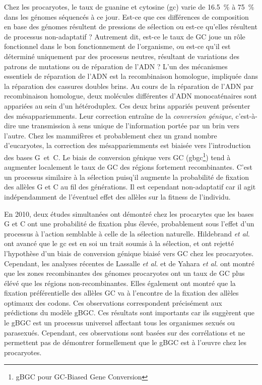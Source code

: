 Chez les procaryotes, le taux de guanine et cytosine (\ac{gc}) varie de
\SI{16.5}{\percent} à \SI{75}{\percent} dans les génomes séquencés à ce jour.
Est-ce que ces différences de composition en base des génomes résultent de
pressions de sélection ou est-ce qu'elles résultent de processus non-adaptatif ?
Autrement dit, est-ce le taux de GC joue un rôle fonctionnel dans le bon
fonctionnement de l'organisme, ou est-ce qu'il est déterminé uniquement par des
processus neutres, résultant de variations des patrons de mutations ou de
réparation de l'ADN ? L'un des mécanismes essentiels de réparation de l'ADN est
la recombinaison homologue, impliquée dans la réparation des cassures doubles
brins. Au cours de la réparation de l'ADN par recombinaison homologue, deux
molécules différentes d'ADN monocaténaires sont appariées au sein d'un
hétéroduplex. Ces deux brins appariés peuvent présenter des mésappariemments.
Leur correction entraîne de la \emph{conversion génique}\cite{chen_gene_2007},
c'est-à-dire une transmission à sens unique de l'information portée par un brin
vers l'autre. Chez les mammifères et probablement chez un grand nombre
d'eucaryotes, la correction des mésappariemments est biaisée vers l'introduction
des bases G~et~C\cite{pessia_evidence_2012}. Le biais de conversion génique vers
GC (\ac{gbgc}\footnote{gBGC pour GC-Biased Gene Conversion}) tend à augmenter
localement le taux de GC des régions fortement
recombinantes\cite{duret_biased_2009,lesecque_gc-biased_2013,williams_non-crossover_2015}.
C'est un processus similaire à la sélection puisq'il augmente la probabilité de
fixation des allèles G et C au fil des générations. Il est cependant
non-adaptatif car il agit indépendamment de l'éventuel effet des allèles sur la
fitness de l'individu.

En 2010, deux études simultanées\cite{hildebrand_evidence_2010,
  hershberg_evidence_2010} ont démontré chez les procarytes que les bases G et C
ont une probabilité de fixation plus élevée, probablement sous l'effet d'un
processus à l'action semblable à celle de la sélection naturelle. Hildebrand
\emph{et al.} ont avancé que le \ac{gc} est en soi un trait soumis à la
sélection, et ont rejetté l'hypothèse d'un biais de conversion génique biaisé
vers GC chez les procaryotes. Cependant, les analyses récentes de Lassalle
\emph{et al.} \cite{lassalle_gc-content_2015} et de Yahara \emph{et
  al.}\cite{yahara_landscape_2016} ont montré que les zones recombinantes des
génomes procaryotes ont un taux de GC plus élévé que les régions
non-recombinantes. Elles également ont montré que la fixation préférentielle des
allèles GC va à l'encontre de la fixation des allèles optimaux des codons. Ces
observations correspondent précisément aux prédictions du modèle gBGC. Ces
résultats sont importants car ils suggèrent que le gBGC est un processus
universel affectant tous les organismes sexués ou parasexués. Cependant, ces
observations sont basées sur des corrélations et ne permettent pas de démontrer
formellement que le gBGC est à l'œuvre chez les procaryotes.

